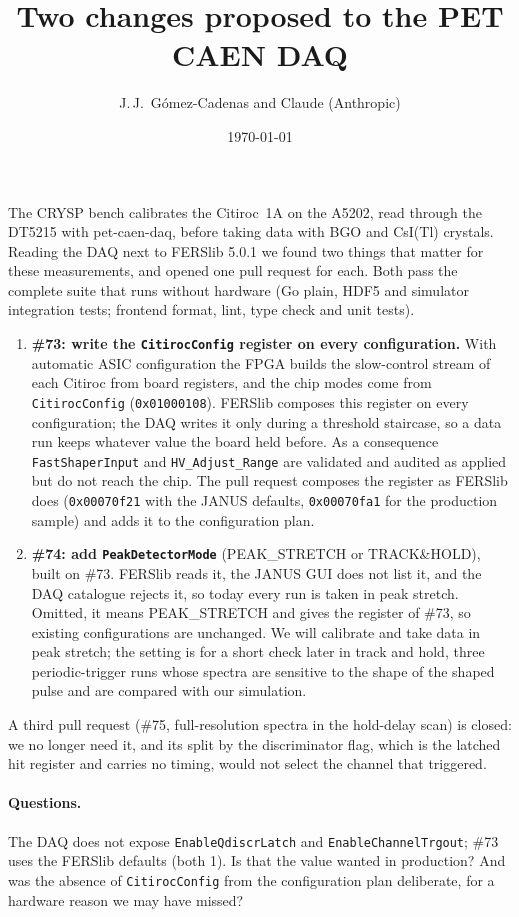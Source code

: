 \documentclass[11pt,a4paper]{article}
\title{Two changes proposed to the PET CAEN DAQ}
\author{J.\,J.~Gómez-Cadenas and Claude (Anthropic)}
\date{\today}
\begin{document}
\maketitle

The CRYSP bench calibrates the Citiroc~1A on the A5202, read through the
DT5215 with pet-caen-daq, before taking data with BGO and CsI(Tl) crystals.
Reading the DAQ next to FERSlib 5.0.1 we found two things that matter for
these measurements, and opened one pull request for each. Both pass the
complete suite that runs without hardware (Go plain, HDF5 and simulator
integration tests; frontend format, lint, type check and unit tests).

\begin{enumerate}
\item {\bf \#73: write the \texttt{CitirocConfig} register on every
  configuration.} With automatic ASIC configuration the FPGA builds the
  slow-control stream of each Citiroc from board registers, and the chip
  modes come from \texttt{CitirocConfig} (\texttt{0x01000108}). FERSlib
  composes this register on every configuration; the DAQ writes it only
  during a threshold staircase, so a data run keeps whatever value the board
  held before. As a consequence \texttt{FastShaperInput} and
  \texttt{HV\_Adjust\_Range} are validated and audited as applied but do not
  reach the chip. The pull request composes the register as FERSlib does
  (\texttt{0x00070f21} with the JANUS defaults, \texttt{0x00070fa1} for the
  production sample) and adds it to the configuration plan.
\item {\bf \#74: add \texttt{PeakDetectorMode}} (PEAK\_STRETCH or
  TRACK\&HOLD), built on \#73. FERSlib reads it, the JANUS GUI does not list
  it, and the DAQ catalogue rejects it, so today every run is taken in peak
  stretch. Omitted, it means PEAK\_STRETCH and gives the register of \#73,
  so existing configurations are unchanged. We will calibrate and take data
  in peak stretch; the setting is for a short check later in track and hold,
  three periodic-trigger runs whose spectra are sensitive to the shape of
  the shaped pulse and are compared with our simulation.
\end{enumerate}

A third pull request (\#75, full-resolution spectra in the hold-delay
scan) is closed: we no longer need it, and its split by the discriminator
flag, which is the latched hit register and carries no timing, would not
select the channel that triggered.

\paragraph{Questions.} The DAQ does not expose \texttt{EnableQdiscrLatch}
and \texttt{EnableChannelTrgout}; \#73 uses the FERSlib defaults (both 1).
Is that the value wanted in production? And was the absence of
\texttt{CitirocConfig} from the configuration plan deliberate, for a
hardware reason we may have missed?
\end{document}
